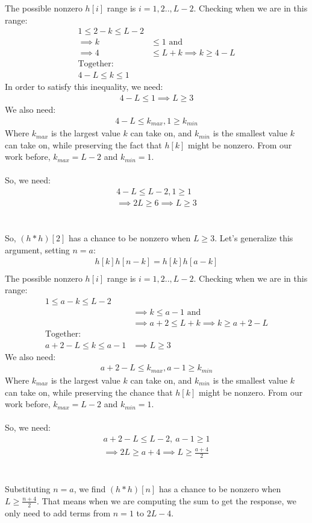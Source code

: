 \documentclass[a4paper]{article}
\begin{document}
The possible nonzero $h[i]$ range is $i = 1,2..,L-2$. Checking when we are in this range:
\begin{align*}
1 \leq 2-k \leq L -2 \\
\implies k &\leq 1 \text{ and}\\
\implies 4 &\leq L + k \implies k \geq 4 - L \\
\text{Together: } \\
4 - L \leq k \leq 1
\end{align*}
In order to satisfy this inequality, we need:
\begin{align*}
4 - L \leq 1 \implies L \geq 3
\end{align*}
We also need:
\begin{align*}
4 - L  \leq k_{max}, 1  \geq k_{min}
\end{align*}
Where $k_{max}$ is the largest value $k$ can take on, and $k_{min}$ is the smallest value $k$ can take on, while preserving the fact that $h[k]$ might be nonzero. From our work before, $k_{max} = L - 2$ and $k_{min} = 1$.
\\\\
So, we need:
\begin{align*}
4 - L \leq L -2, 1 \geq 1 \\
\implies 2L \geq 6 \implies L \geq 3
\end{align*}
\\\\
So, $(h*h)[2]$ has a chance to be nonzero when $L \geq 3$.
\clearpage
Let's generalize this argument, setting $n = a$:
\begin{align*}
h[k]h[n-k] = h[k]h[a-k] \\
\end{align*}
The possible nonzero $h[i]$ range is $i = 1,2..,L-2$. Checking when we are in this range:
\begin{align*}
1 \leq a-k \leq L -2 \\
&\implies k \leq a - 1 \text{ and}\\
&\implies a + 2 \leq L + k \implies k \geq a + 2 - L \\
\text{Together: } \\
a + 2 - L \leq k \leq a - 1
&\implies L \geq 3
\end{align*}
We also need:
\begin{align*}
a + 2 - L  \leq k_{max}, a - 1  \geq k_{min}
\end{align*}
Where $k_{max}$ is the largest value $k$ can take on, and $k_{min}$ is the smallest value $k$ can take on, while preserving the chance that $h[k]$ might be nonzero. From our work before, $k_{max} = L - 2$ and $k_{min} = 1$.
\\\\
So, we need:
\begin{align*}
a +2 - L \leq L -2,~a-1 \geq 1 \\
\implies 2L \geq a + 4 \implies L \geq \frac{a+4}{2}
\end{align*}
\\\\
Substituting $n = a$, we find $(h*h)[n]$ has a chance to be nonzero when $L \geq \frac{n+4}{2}$. That means when we are computing the sum to get the response, we only need to add terms from $n = 1$ to $2L - 4$.
\end{document}

